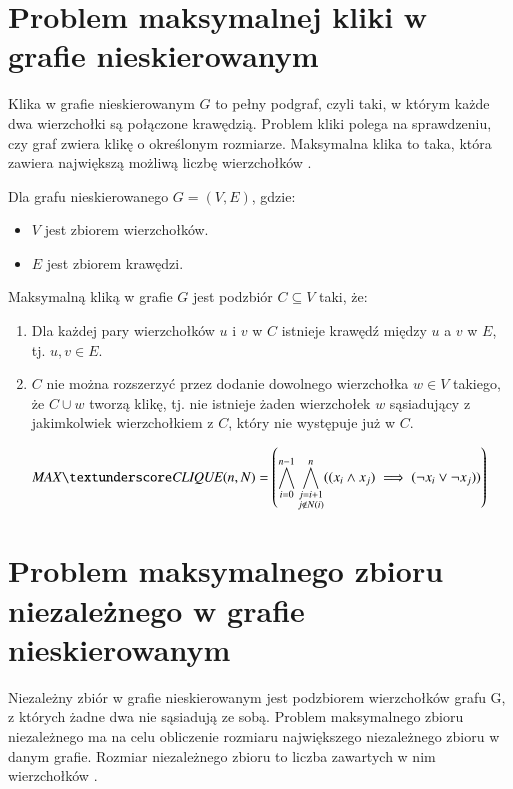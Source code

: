 \section{Problem maksymalnej kliki w grafie nieskierowanym}

Klika w grafie nieskierowanym \(G\) to pełny podgraf, czyli taki, w którym każde dwa wierzchołki są połączone krawędzią. Problem kliki polega na sprawdzeniu, czy graf zwiera klikę o określonym rozmiarze. Maksymalna klika to taka, która zawiera największą możliwą liczbę wierzchołków \cite{Sipser0086373}. 

Dla grafu nieskierowanego $G = (V, E)$, gdzie:
\begin{itemize}
 	\item \(V\) jest zbiorem wierzchołków.
 	\item \(E\) jest zbiorem krawędzi.
\end{itemize}
Maksymalną kliką w grafie \(G\) jest podzbiór $C \subseteq V$ taki, że:
\begin{enumerate}
 	\item Dla każdej pary wierzchołków \(u\) i \(v\) w \(C\) istnieje krawędź między \(u\) a \(v\) w \(E\), tj. ${u, v}\in E$. 
 	\item \(C\) nie można rozszerzyć przez dodanie dowolnego wierzchołka $w\in V$ takiego, że $C \cup {w}$ tworzą klikę, tj. nie istnieje żaden wierzchołek \(w\) sąsiadujący z jakimkolwiek wierzchołkiem z \(C\), który nie występuje już w \(C\).
\end{enumerate}

\begin{align*}
	\MAXCLIQUE(n, N) = 
	\left( \bigwedge_{i=0}^{n-1} \bigwedge_{\substack{j=i+1 \\ j \notin N(i)}}^{n} ((x_i \land x_j) \implies (\lnot x_i \lor \lnot x_j)) \right)	
\end{align*}

\section{Problem maksymalnego zbioru niezależnego w grafie nieskierowanym}

Niezależny zbiór w grafie nieskierowanym jest podzbiorem wierzchołków grafu G, z których żadne dwa nie sąsiadują ze sobą. Problem maksymalnego zbioru niezależnego ma na celu obliczenie rozmiaru największego niezależnego zbioru w danym grafie. Rozmiar niezależnego zbioru to liczba zawartych w nim wierzchołków \cite{Korshunov1974}.

